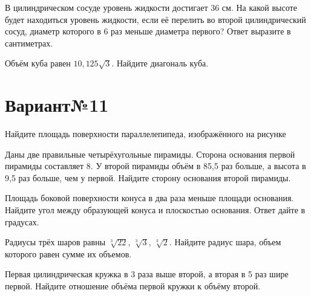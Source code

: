 \documentclass[4apaper]{article}
\begin{document}
\begin{taskBN}{5}
В цилиндрическом сосуде уровень жидкости достигает 36 см. На какой высоте будет находиться уровень жидкости, если её перелить во второй цилиндрический сосуд, диаметр которого в 6 раз меньше диаметра первого? Ответ выразите в сантиметрах.
\end{taskBN}

\begin{taskBN}{6}
Объём куба равен $10,125\sqrt{3}$. Найдите диагональ куба.
\end{taskBN}
\newpage\section*{Вариант№11}

\begin{taskBN}{1}
Найдите площадь поверхности параллелепипеда, изображённого на рисунке
\end{taskBN}

\begin{taskBN}{2}
Даны две правильные четырёхугольные пирамиды. Сторона основания первой пирамиды составляет 8. У второй пирамиды объём в 85,5 раз больше, а высота в 9,5 раз больше, чем у первой. Найдите сторону основания второй пирамиды.
\end{taskBN}

\begin{taskBN}{3}
Площадь боковой поверхности конуса в два раза меньше площади основания. Найдите угол между образующей конуса и плоскостью основания. Ответ дайте в градусах.
\end{taskBN}

\begin{taskBN}{4}
Радиусы трёх шаров равны $\sqrt[3]{22}$, $\sqrt[3]{3}$, $\sqrt[3]{2}$. Найдите радиус шара, объем которого равен сумме их объемов.
\end{taskBN}

\begin{taskBN}{5}
 Первая цилиндрическая кружка в 3 раза выше второй, а вторая в 5 раз шире первой. Найдите отношение объёма первой кружки к объёму второй.
\end{taskBN}
\end{document}
